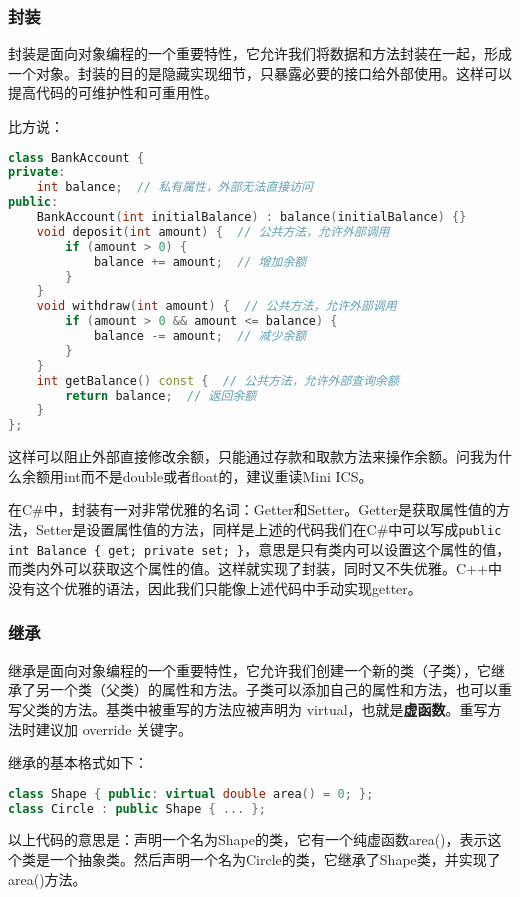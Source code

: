 \subsubsection{封装}

封装是面向对象编程的一个重要特性，它允许我们将数据和方法封装在一起，形成一个对象。封装的目的是隐藏实现细节，只暴露必要的接口给外部使用。这样可以提高代码的可维护性和可重用性。

比方说：
\begin{lstlisting}[language=C++]
class BankAccount {
private:
    int balance;  // 私有属性，外部无法直接访问
public:
    BankAccount(int initialBalance) : balance(initialBalance) {}
    void deposit(int amount) {  // 公共方法，允许外部调用
        if (amount > 0) {
            balance += amount;  // 增加余额
        }
    }
    void withdraw(int amount) {  // 公共方法，允许外部调用
        if (amount > 0 && amount <= balance) {
            balance -= amount;  // 减少余额
        }
    }
    int getBalance() const {  // 公共方法，允许外部查询余额
        return balance;  // 返回余额
    }
};
\end{lstlisting}
这样可以阻止外部直接修改余额，只能通过存款和取款方法来操作余额。问我为什么余额用int而不是double或者float的，建议重读Mini ICS。

\begin{tip}
  在C\#中，封装有一对非常优雅的名词：Getter和Setter。Getter是获取属性值的方法，Setter是设置属性值的方法，同样是上述的代码我们在C\#中可以写成\texttt{public int Balance \{ get; private set; \}}，意思是只有类内可以设置这个属性的值，而类内外可以获取这个属性的值。这样就实现了封装，同时又不失优雅。C++中没有这个优雅的语法，因此我们只能像上述代码中手动实现getter。
\end{tip}

\subsubsection{继承}

继承是面向对象编程的一个重要特性，它允许我们创建一个新的类（子类），它继承了另一个类（父类）的属性和方法。子类可以添加自己的属性和方法，也可以重写父类的方法。基类中被重写的方法应被声明为 virtual，也就是\textbf{虚函数}。重写方法时建议加 override 关键字。

继承的基本格式如下：
\begin{lstlisting}[language=C++]
class Shape { public: virtual double area() = 0; };
class Circle : public Shape { ... };
\end{lstlisting}
以上代码的意思是：声明一个名为Shape的类，它有一个纯虚函数area()，表示这个类是一个抽象类。然后声明一个名为Circle的类，它继承了Shape类，并实现了area()方法。

